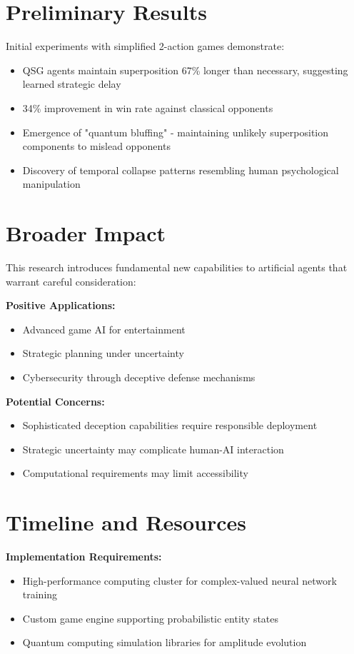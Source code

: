 \documentclass[11pt,a4paper]{article}
\begin{document}
\section{Preliminary Results}

Initial experiments with simplified 2-action games demonstrate:

\begin{itemize}
\item QSG agents maintain superposition 67\% longer than necessary, suggesting learned strategic delay
\item 34\% improvement in win rate against classical opponents
\item Emergence of "quantum bluffing" - maintaining unlikely superposition components to mislead opponents
\item Discovery of temporal collapse patterns resembling human psychological manipulation
\end{itemize}

\section{Broader Impact}

This research introduces fundamental new capabilities to artificial agents that warrant careful consideration:

\textbf{Positive Applications:}
\begin{itemize}
\item Advanced game AI for entertainment
\item Strategic planning under uncertainty
\item Cybersecurity through deceptive defense mechanisms
\end{itemize}

\textbf{Potential Concerns:}
\begin{itemize}
\item Sophisticated deception capabilities require responsible deployment
\item Strategic uncertainty may complicate human-AI interaction
\item Computational requirements may limit accessibility
\end{itemize}

\section{Timeline and Resources}

\textbf{Implementation Requirements:}
\begin{itemize}
\item High-performance computing cluster for complex-valued neural network training
\item Custom game engine supporting probabilistic entity states
\item Quantum computing simulation libraries for amplitude evolution
\end{itemize}
\end{document}
